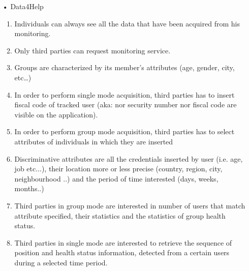 \begin{enumerate}
\item[•] {\Large Data4Help}
	\begin{enumerate}
	\item Individuals can always see all the data that have been acquired from his monitoring.
	\item Only third parties can request monitoring service.
	\item Groups are characterized by its member’s attributes (age, gender, city, etc…)
	\item In order to perform single mode acquisition, third parties has to insert fiscal code of tracked user (aka: nor security number nor fiscal code are visible on the application).
	\item In order to perform group mode acquisition, third parties has to select attributes of individuals in which they are inserted 
	\item Discriminative attributes are all the credentials inserted by user (i.e. age, job etc...), their location more or less precise (country, region, city, neighbourhood ..) and the period of time interested (days, weeks, months..)
	\item Third parties in group mode are interested in number of users that match attribute specified, their statistics and the statistics of group health status.
	\item Third parties in single mode are interested to retrieve the sequence of position and  health status information, detected from a certain users during a selected time period.
	\end{enumerate}
	

\end{enumerate}
